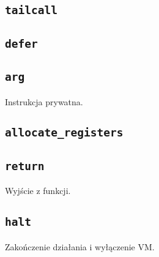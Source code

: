 \subsection{\texttt{tailcall}}
\subsection{\texttt{defer}}
\subsection{\texttt{arg}}

Instrukcja prywatna.

\subsection{\texttt{allocate\_registers}}

\subsection{\texttt{return}}

Wyjście z funkcji.

\subsection{\texttt{halt}}

Zakończenie działania i wyłączenie VM.
